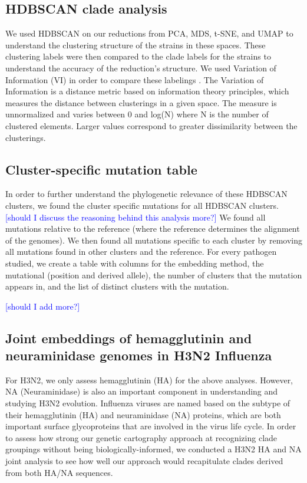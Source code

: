 \documentclass[10pt,letterpaper]{article}
\def\snc#1{\textcolor{blue}{[#1]}}
\begin{document}
\subsection*{HDBSCAN clade analysis}
We used HDBSCAN \cite{campello2015hierarchical} on our reductions from PCA, MDS, t-SNE, and UMAP to understand the clustering structure of the strains in these spaces.
These clustering labels were then compared to the clade labels for the strains to understand the accuracy of the reduction's structure.
We used Variation of Information (VI) in order to compare these labelings \cite{meilua2003comparing}.
The Variation of Information is a distance metric based on information theory principles, which measures the distance between clusterings in a given space.
The measure is unnormalized and varies between 0 and log(N) where N is the number of clustered elements.
Larger values correspond to greater dissimilarity between the clusterings.

\subsection*{Cluster-specific mutation table}
In order to further understand the phylogenetic relevance of these HDBSCAN clusters, we found the cluster specific mutations for all HDBSCAN clusters.
\snc{should I discuss the reasoning behind this analysis more?}
We found all mutations relative to the reference (where the reference determines the alignment of the genomes).
We then found all mutations specific to each cluster by removing all mutations found in other clusters and the reference.
For every pathogen studied, we create a table with columns for the embedding method, the mutational (position and derived allele), the number of clusters that the mutation appears in, and the list of distinct clusters with the mutation.

\snc{should I add more?}

\subsection*{Joint embeddings of hemagglutinin and neuraminidase genomes in H3N2 Influenza}

For H3N2, we only assess hemagglutinin (HA) for the above analyses.
However, NA (Neuraminidase) is also an important component in understanding and studying H3N2 evolution.
Influenza viruses are named based on the subtype of their hemagglutinin (HA) and neuraminidase (NA) proteins, which are both important surface glycoproteins that are involved in the virus life cycle.
In order to assess how strong our genetic cartography approach at recognizing clade groupings without being biologically-informed, we conducted a H3N2 HA and NA joint analysis to see how well our approach would recapitulate clades derived from both HA/NA sequences.
\end{document}
